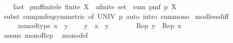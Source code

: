 \begin{isabellebody}
\ \ \isamarkupfalse%
\ fast%
\endisatagproof
{\isafoldproof}%
%
\isadelimproof
\isanewline
%
\endisadelimproof
\isanewline
{}\isamarkupfalse%
\ pmf{\isacharunderscore}{\kern0pt}finite{\isacharunderscore}{\kern0pt}le{\isacharcolon}{\kern0pt}\ {\isachardoublequoteopen}finite\ {\isacharparenleft}{\kern0pt}X\ {\isacharcolon}{\kern0pt}{\isacharcolon}{\kern0pt}\ {\isacharparenleft}{\kern0pt}{\isacharprime}{\kern0pt}a{\isacharcolon}{\kern0pt}{\isacharcolon}{\kern0pt}finite{\isacharparenright}{\kern0pt}\ set{\isacharparenright}{\kern0pt}\ {\isasymLongrightarrow}\ sum\ {\isacharparenleft}{\kern0pt}pmf\ p{\isacharparenright}{\kern0pt}\ X\ {\isasymle}\ {}{\isachardoublequoteclose}\isanewline
%
\isadelimproof
\ \ %
\endisadelimproof
%
\isatagproof
{}\isamarkupfalse%
\ {\isacharparenleft}{\kern0pt}subst\ sum{\isacharunderscore}{\kern0pt}pmf{\isacharunderscore}{\kern0pt}eq{\isacharunderscore}{\kern0pt}{}{\isacharbrackleft}{\kern0pt}symmetric{\isacharcomma}{\kern0pt}\ of\ UNIV\ p{\isacharbrackright}{\kern0pt}{\isacharparenright}{\kern0pt}\ {\isacharparenleft}{\kern0pt}auto\ intro{\isacharcolon}{\kern0pt}\ sum{\isacharunderscore}{\kern0pt}mono{}{\isacharparenright}{\kern0pt}%
\endisatagproof
{\isafoldproof}%
%
\isadelimproof
\isanewline
%
\endisadelimproof
\isanewline
{}\isamarkupfalse%
\ mod{\isacharunderscore}{\kern0pt}less{\isacharunderscore}{\kern0pt}diff{\isacharcolon}{\kern0pt}\ \isanewline
\ \ \ {\isachardoublequoteopen}{}\ {\isacharless}{\kern0pt}\ {\isacharparenleft}{\kern0pt}x{\isacharcolon}{\kern0pt}{\isacharcolon}{\kern0pt}{\isacharprime}{\kern0pt}s{\isacharcolon}{\kern0pt}{\isacharcolon}{\kern0pt}{\isacharbraceleft}{\kern0pt}mod{\isacharunderscore}{\kern0pt}type{\isacharbraceright}{\kern0pt}{\isacharparenright}{\kern0pt}{\isachardoublequoteclose}\ {\isachardoublequoteopen}x\ {\isasymle}\ y{\isachardoublequoteclose}\ \isanewline
\ \ \ {\isachardoublequoteopen}y\ {\isacharminus}{\kern0pt}\ x\ {\isacharless}{\kern0pt}\ y{\isachardoublequoteclose}\isanewline
%
\isadelimproof
%
\endisadelimproof
%
\isatagproof
{}\isamarkupfalse%
\ {\isacharminus}{\kern0pt}\isanewline
\ \ \isamarkupfalse%
\ {\isachardoublequoteopen}{}\ {\isasymle}\ Rep\ y\ {\isacharminus}{\kern0pt}\ Rep\ x{\isachardoublequoteclose}\isanewline
\ \ \ \ \isamarkupfalse%
\ assms\ mono{\isacharunderscore}{\kern0pt}Rep\ \isamarkupfalse%
\ mono{\isacharunderscore}{\kern0pt}def\isanewline

\end{isabellebody}
